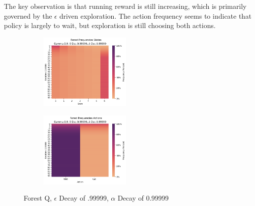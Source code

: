 \documentclass[letterpaper]{article} %
\begin{document}
The key observation is that running reward is still increasing, which is primarily governed by the $\epsilon$ driven exploration.  The action frequency seems to indicate that policy is largely to wait, but exploration is still choosing both actions.  


\begin{figure}[!htb]
	\begin{subfigure}[b]{0.25\textwidth}
		\centering
		\includegraphics[width=1.75in]{Figures/Forest_Frequencies_States_Gamma_0_9__E_Dec_0_99999__A_Dec_0_99999.png}
  	\end{subfigure}%
	\begin{subfigure}[b]{0.25\textwidth}
		\centering
		\includegraphics[width=1.75in]{Figures/Forest_Frequencies_Actions_Gamma_0_9__E_Dec_0_99999__A_Dec_0_99999.png}
  	\end{subfigure}%
\caption{Forest Q,  $\epsilon$ Decay of .99999, $\alpha$ Decay of 0.99999}
\label{fig:forest_q_e_99999_a_99999_frequencies}
\end{figure}
\end{document}
